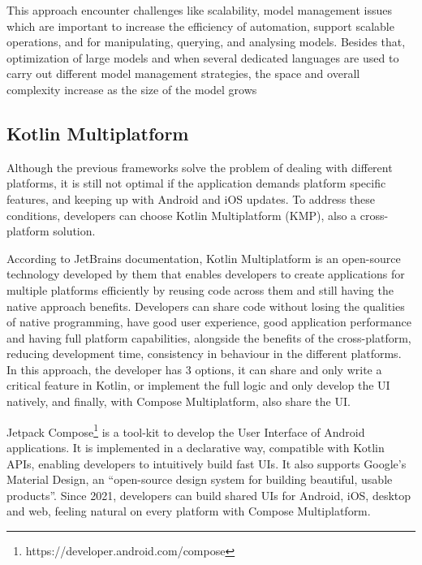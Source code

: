 This approach encounter challenges like scalability, model management issues which are important to increase the efficiency of automation, support scalable operations, and for manipulating, querying, and analysing models. Besides that, optimization of large models and when several dedicated languages are used to carry out different model management strategies, the space and overall complexity increase as the size of the model grows\cite{9908726}



\subsection{Kotlin Multiplatform}\label{subsec:kotlin-multiplatform}

Although the previous frameworks solve the problem of dealing with different platforms, it is still not optimal if the application demands platform specific features, and keeping up with Android and iOS updates. To address these conditions, developers can choose Kotlin Multiplatform (KMP), also a cross-platform solution. 

According to JetBrains documentation, Kotlin Multiplatform is an open-source technology developed by them that enables developers to create applications for multiple platforms efficiently by reusing code across them and still having the native approach benefits\cite{kmp}. Developers can share code without losing the qualities of native programming, have good user experience, good application performance and having full platform capabilities, alongside the benefits of the cross-platform, reducing development time, consistency in behaviour in the different platforms\cite{Janakaraj2025}. In this approach, the developer has 3 options, it can share and only write a critical feature in Kotlin, or implement the full logic and only develop the UI natively, and finally, with Compose Multiplatform, also share the UI\cite{kmp}.

Jetpack Compose\footnote{https://developer.android.com/compose} is a tool-kit to develop the User Interface of Android applications. It is implemented in a declarative way, compatible with Kotlin APIs, enabling developers to intuitively build fast UIs. It also supports Google's Material Design, an ``open-source design system for building beautiful, usable products''\cite{materialD}. Since 2021, developers can build shared UIs for Android, iOS, desktop and web, feeling natural on every platform with Compose Multiplatform.\cite{compose-multi}

